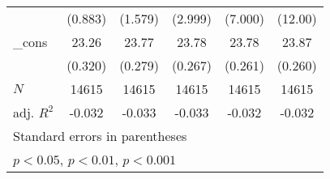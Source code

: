{\begin{tabular}{l*{5}{c}}
            &     (0.883)         &     (1.579)         &     (2.999)         &     (7.000)         &     (12.00)         \\
[1em]
\_cons      &       23.26\sym{***}&       23.77\sym{***}&       23.78\sym{***}&       23.78\sym{***}&       23.87\sym{***}\\
            &     (0.320)         &     (0.279)         &     (0.267)         &     (0.261)         &     (0.260)         \\
\hline
\(N\)       &       14615         &       14615         &       14615         &       14615         &       14615         \\
adj. \(R^{2}\)&      -0.032         &      -0.033         &      -0.033         &      -0.032         &      -0.032         \\
\hline\hline
\multicolumn{6}{l}{\footnotesize Standard errors in parentheses}\\
\multicolumn{6}{l}{\footnotesize \sym{*} \(p<0.05\), \sym{**} \(p<0.01\), \sym{***} \(p<0.001\)}\\
\end{tabular}
}
